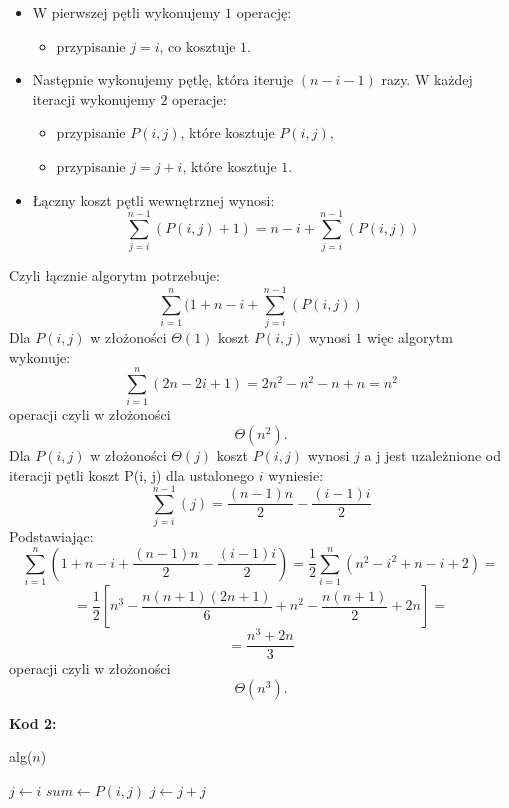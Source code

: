 \documentclass[12pt]{article}
\begin{document}
    \begin{itemize}
  \item W pierwszej pętli wykonujemy $1$ operację:
    \begin{itemize}
      \item przypisanie $j = i$, co kosztuje $1$.
    \end{itemize}
  \item Następnie wykonujemy pętlę, która iteruje $(n - i - 1)$ razy. W każdej iteracji wykonujemy $2$ operacje:
    \begin{itemize}
      \item przypisanie $P(i, j)$, które kosztuje $P(i, j)$,
      \item przypisanie $j = j + i$, które kosztuje $1$.
    \end{itemize}
  \item Łączny koszt pętli wewnętrznej wynosi:
    \[
        \sum_{j=i}^{n-1}(P(i,j) + 1) = n - i + \sum_{j=i}^{n-1}(P(i, j))
    \]
\end{itemize}
	 Czyli łącznie algorytm potrzebuje: 
    $$
    \sum_{i=1}^{n}( 1 + n - i + \sum_{j=i}^{n-1}(P(i,j))
    $$
    Dla $P(i,j)$ w złożoności $\Theta(1)$ koszt $P(i, j)$ wynosi $1$ więc algorytm wykonuje:
	\[
		\sum_{i=1}^{n} (2n - 2i + 1) = 2n^{2} - n^{2} -n + n = n^{2}
	\]
	operacji czyli w złożoności 
	\[
		\Theta(n^{2}).
	\]
    Dla $P(i,j)$ w złożoności $\Theta(j)$ koszt $P(i, j)$ wynosi $j$ a j jest uzależnione od iteracji pętli koszt P(i, j) dla ustalonego $i$ wyniesie:
	\[
    \sum_{j=i}^{n-1}(j) = \frac{(n-1)n}{2} - \frac{(i-1)i}{2}
	\]
    Podstawiając: 
    \[
        \sum_{i=1}^{n} (1 + n - i + \frac{(n-1)n}{2} - \frac{(i-1)i}{2}) = \frac{1}{2} \sum_{i=1}^{n}(n^2 - i^2 + n - i + 2 ) =
    \]
    \[
        =\frac{1}{2} \left[ n^3 - \frac{n(n+1)(2n+1)}{6} + n^2 - \frac{n(n+1)}{2} + 2n \right]=
    \]
    \[
        =\frac{n^3 + 2n}{3}
    \]
	operacji czyli w złożoności 
	\[
		\Theta(n^{3}).
	\]

	\newpage
	\textbf{Kod 2:}
     \begin{algorithm}
        \caption{alg($n$)}
        \begin{algorithmic}[1]
            \State $j \gets i$
                \State $sum \gets P(i,j)$
                \State $j \gets j + j$
            \EndWhile
        \EndFor
        \end{algorithmic}
    \end{algorithm}
\end{document}
